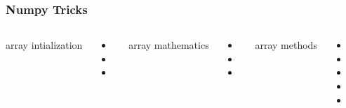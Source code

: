 \documentclass{beamer}
\begin{document}
\begin{frame}[fragile]

    \frametitle{Numpy Tricks}


    \begin{columns}[t]


            array intialization

            \begin{itemize}
                \item {}

                \item {}

                \item {}

            \end{itemize}




            array mathematics

            \begin{itemize}
                \item {}
                \item \code{ += }
                \item {}
            \end{itemize}

            array methods

            \begin{itemize}
                \item {}
                \item {}
                \item {}
                \item {}
                \item {}
            \end{itemize}

    \end{columns}

\end{frame}
\end{document}
